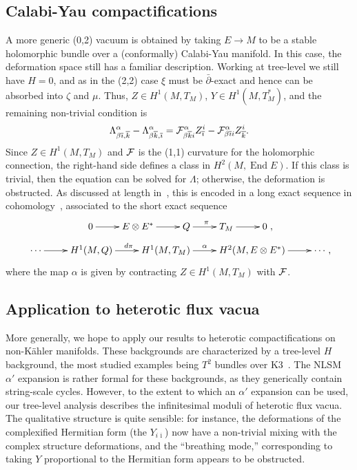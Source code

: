 \documentclass[11pt, a4paper]{article}
\def\End{\operatorname{End}}
\def\pb{\bar{\partial}}
\def\cF{{\cal F}}
\newcommand\ib{\overline{\imath}}
\newcommand\kb{\overline{k}}
\begin{document}
\subsection{Calabi-Yau compactifications}
A more generic (0,2) vacuum is obtained by taking $E\to M$ to be  a stable holomorphic bundle
over a (conformally) Calabi-Yau manifold.  In this case, the deformation space still has a 
familiar description.  Working at tree-level we still have $H=0$, and as in the (2,2) case
$\xi$ must be $\pb$-exact and hence can be absorbed into $\zeta$ and $\mu$.  Thus, $Z \in H^1(M,T_M)$, $Y\in H^1(M,T^\ast_M)$, and the remaining non-trivial
condition is
$$ \Lambda^\alpha_{\beta\ib,\kb} - \Lambda^\alpha_{\beta\kb,\ib} = 
 \cF^\alpha_{\beta\kb i} Z^i_{\ib} - \cF^\alpha_{\beta\ib i} Z^i_{\kb}.$$
Since $Z \in H^1(M,T_M)$ and $\cF$ is the (1,1) curvature for the holomorphic connection, the right-hand side defines a class in $H^2(M,\End E)$.  If this class
is trivial, then the equation can be solved for $\Lambda$; otherwise, the deformation is
obstructed.  As discussed at length in~\cite{Anderson:2011ty}, this is encoded in a long
exact sequence in cohomology~\cite{Atiyah:1957xx}, associated to the short
exact sequence
\begin{align*}
\xymatrix{ 0 \ar[r] & E\otimes E^\ast \ar[r] & Q \ar[r]^{\pi}  & T_M \ar[r] & 0 } ,
\end{align*}
\begin{align*}
\xymatrix{\cdots \ar[r] & H^1(M,Q) \ar[r]^{d\pi} &
 H^1(M,T_M) \ar[r]^-{\alpha} &H^2(M,E \otimes E^\ast) \ar[r] &\cdots},
\end{align*}
where the map $\alpha$ is given by contracting $Z \in H^1(M,T_M)$ with $\cF$.

\subsection{Application to heterotic flux vacua}
More generally, we hope to apply our results to heterotic compactifications on non-K\"ahler
manifolds.  These backgrounds are characterized by a tree-level $H$ background, the most
studied examples being $T^2$ bundles over K3~\cite{Dasgupta:1999ss,Becker:2006et,Becker:2009df}.  The NLSM $\alpha'$ expansion is rather formal for these backgrounds, as they generically contain string-scale cycles.  However, to the extent to which an $\alpha'$ expansion can be
used, our tree-level analysis describes the infinitesimal moduli of heterotic flux vacua.  The 
qualitative structure is quite sensible:  for instance,  the deformations of the complexified Hermitian form (the $Y_{i\ib}$) now have a non-trivial mixing with the complex structure deformations, and the ``breathing mode,'' corresponding to taking $Y$ proportional to the Hermitian form appears to be obstructed.  
\end{document}
